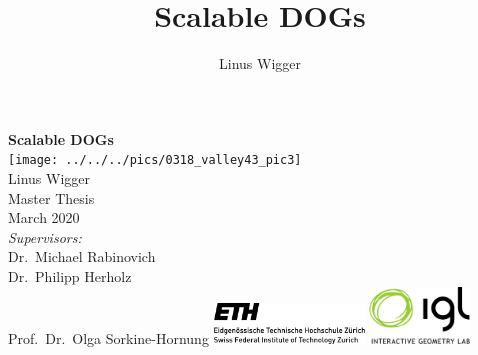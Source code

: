 \documentclass[a4paper,twoside,12pt,nochapterprefix]{scrbook}
\title{Scalable DOGs}
\author{Linus Wigger}
\begin{document}
\begin{titlepage}
	\topmargin 1.0cm
	\oddsidemargin 0.0cm
	\evensidemargin 0.0cm
	\centering
	\Huge
	\vspace{3.0cm}
	\textbf{\textsf{Scalable DOGs}} \\[2.0cm]
	\texttt{[image: ../../../pics/0318\_valley43\_pic3]} \\ %
	\vspace{3cm}
	\sffamily
	\Large
	Linus Wigger
	\\[0.8cm]
	\large
	Master Thesis %
	\\
	March 2020
	\\[1.3cm]
	\emph{Supervisors:}\\
	Dr.\ Michael Rabinovich\\ 					%
	Dr.\ Philipp Herholz\\ 					%
	Prof.\ Dr.\ Olga Sorkine-Hornung		%
	\vfill
	\includegraphics*[width=0.3\textwidth]{figures/ETH_logo} \hfill
	\includegraphics*[width=0.2\textwidth]{figures/IGL_logo}
	\vspace{3.4cm}
\end{titlepage}

\setcounter{page}{1}

\end{document}
